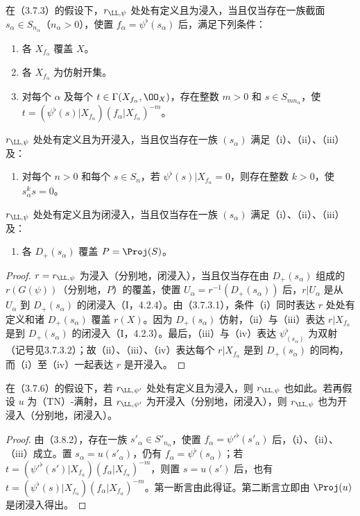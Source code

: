 在（3.7.3）的假设下，$r_{\LL,\psi}$ 处处有定义且为浸入，当且仅当存在一族截面 $s_\alpha\in S_{n_\alpha}$（$n_\alpha>0$），使置 $f_\alpha=\psi^\flat(s_\alpha)$ 后，满足下列条件：
\begin{enumerate}[label=(\roman*)]
\item 各 $X_{f_\alpha}$ 覆盖 $X$。
\item 各 $X_{f_\alpha}$ 为仿射开集。
\item 对每个 $\alpha$ 及每个 $t\in\Gamma(X_{f_\alpha},\OO_X)$，存在整数 $m>0$ 和 $s\in S_{mn_\alpha}$，使
$t=(\psi^\flat(s)|X_{f_\alpha})(f_\alpha|X_{f_\alpha})^{-m}$。
\end{enumerate}
$r_{\LL,\psi}$ 处处有定义且为开浸入，当且仅当存在一族 $(s_\alpha)$ 满足（i）、（ii）、（iii）及：
\begin{enumerate}[label=(\roman*),start=4]
\item 对每个 $n>0$ 和每个 $s\in S_n$，若 $\psi^\flat(s)|X_{f_\alpha}=0$，则存在整数 $k>0$，使 $s_\alpha^ks=0$。
\end{enumerate}
$r_{\LL,\psi}$ 处处有定义且为闭浸入，当且仅当存在一族 $(s_\alpha)$ 满足（i）、（ii）、（iii）及：
\begin{enumerate}[label=(\roman*),start=5]
\item 各 $D_+(s_\alpha)$ 覆盖 $P=\Proj(S)$。
\end{enumerate}
\begin{proof}
$r=r_{\LL,\psi}$ 为浸入（分别地，闭浸入），当且仅当存在由 $D_+(s_\alpha)$ 组成的 $r(G(\psi))$（分别地，$P$）的覆盖，使置 $U_\alpha=r^{-1}(D_+(s_\alpha))$ 后，$r|U_\alpha$ 是从 $U_\alpha$ 到 $D_+(s_\alpha)$ 的闭浸入（I，4.2.4）。由（3.7.3.1），条件（i）同时表达 $r$ 处处有定义和诸 $D_+(s_\alpha)$ 覆盖 $r(X)$。因为 $D_+(s_\alpha)$ 仿射，（ii）与（iii）表达 $r|X_{f_\alpha}$ 是到 $D_+(s_\alpha)$ 的闭浸入（I，4.2.3）。最后，（iii）与（iv）表达 $\psi^\flat_{(s_\alpha)}$ 为双射（记号见3.7.3.2）；故（ii）、（iii）、（iv）表达每个 $r|X_{f_\alpha}$ 是到 $D_+(s_\alpha)$ 的同构，而（i）至（iv）一起表达 $r$ 是开浸入。
\end{proof}

在（3.7.6）的假设下，若 $r_{\LL,\psi'}$ 处处有定义且为浸入，则 $r_{\LL,\psi}$ 也如此。若再假设 $u$ 为（TN）-满射，且 $r_{\LL,\psi'}$ 为开浸入（分别地，闭浸入），则 $r_{\LL,\psi}$ 也为开浸入（分别地，闭浸入）。
\begin{proof}
由（3.8.2），存在一族 $s'_\alpha\in S'_{n_\alpha}$，使置 $f_\alpha=\psi'^\flat(s'_\alpha)$ 后，（i）、（ii）、（iii）成立。置 $s_\alpha=u(s'_\alpha)$，仍有 $f_\alpha=\psi^\flat(s_\alpha)$；若
$t=(\psi'^\flat(s')|X_{f_\alpha})(f_\alpha|X_{f_\alpha})^{-m}$，则置 $s=u(s')$ 后，也有
$t=(\psi^\flat(s)|X_{f_\alpha})(f_\alpha|X_{f_\alpha})^{-m}$。第一断言由此得证。第二断言立即由 $\Proj(u)$ 是闭浸入得出。
\end{proof}

